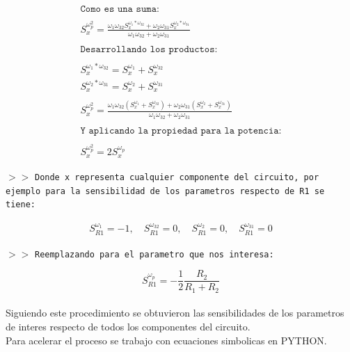 \begin{gather*}
    \texttt{Como es una suma:} \\\\
    S^{\omega_{p}^{2}}_{x}=\frac{\omega_1 \omega_{32} S^{\omega_1 * \omega_{32}}_{x} + \omega_2 \omega_{31} S^{\omega_2 * \omega_{31}}_{x}}{\omega_1 \omega_{32} + \omega_2 \omega_{31}} \\\\
    \texttt{Desarrollando los productos:} \\\\
    S^{\omega_1 * \omega_{32}}_{x} = S^{\omega_1}_{x} + S^{\omega_{32}}_{x} \\ 
    S^{\omega_2 * \omega_{31}}_{x} = S^{\omega_2}_{x} + S^{\omega_{31}}_{x} \\\\
    S^{\omega_{p}^{2}}_{x} = \frac{\omega_1 \omega_{32} (S^{\omega_1}_{x} + S^{\omega_{32}}_{x}) + \omega_2 \omega_{31} (S^{\omega_2}_{x} + S^{\omega_{31}}_{x})}{\omega_1 \omega_{32} + \omega_2 \omega_{31}} \\\\
    \texttt{Y aplicando la propiedad para la potencia:} \\\\
    S^{\omega_{p}^{2}}_{x} = 2 S^{\omega_{p}}_{x}
\end{gather*}

\noindent $>>$ \texttt{Donde x representa cualquier componente del circuito, por ejemplo para la sensibilidad de los parametros respecto de R1 se tiene:}

\begin{align*}
    S^{\omega_1}_{R1} = -1, \quad
    S^{\omega_{32}}_{R1} = 0, \quad
    S^{\omega_{2}}_{R1} = 0, \quad
    S^{\omega_{31}}_{R1} = 0
\end{align*}

\noindent $>>$ \texttt{Reemplazando para el parametro que nos interesa:}

\begin{equation*}
    S^{\omega_{p}}_{R1} = - \frac{1}{2} \frac{R_{2}}{R_{1} + R_{2}}
\end{equation*} \\

Siguiendo este procedimiento se obtuvieron las sensibilidades de los parametros de interes respecto de todos los componentes del circuito. \\
Para acelerar el proceso se trabajo con ecuaciones simbolicas en PYTHON.\\

